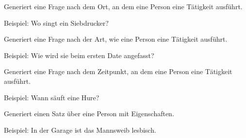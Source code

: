 \documentclass[a4paper,12pt,oneside]{sphinxmanual}
\begin{document}

\begin{fulllineitems}
\label{module:pyzufall.satz.satz_frage_3}
Generiert eine Frage nach dem Ort, an dem eine Person eine Tätigkeit ausführt.

Beispiel: Wo singt ein Siebdrucker?

\end{fulllineitems}


\begin{fulllineitems}
\label{module:pyzufall.satz.satz_frage_4}
Generiert eine Frage nach der Art, wie eine Person eine Tätigkeit ausführt.

Beispiel: Wie wird sie beim ersten Date angefasst?

\end{fulllineitems}


\begin{fulllineitems}
\label{module:pyzufall.satz.satz_frage_5}
Generiert eine Frage nach dem Zeitpunkt, an dem eine Person eine Tätigkeit ausführt.

Beispiel: Wann säuft eine Hure?

\end{fulllineitems}


\begin{fulllineitems}
\label{module:pyzufall.satz.satz_freunde_lieben}
Generiert einen Satz über eine Person mit Eigenschaften.

Beispiel: In der Garage ist das Mannsweib lesbisch.

\end{fulllineitems}

\end{document}
